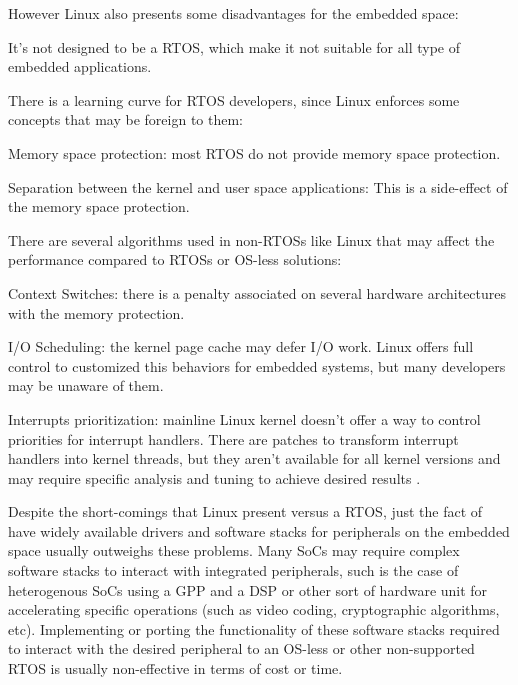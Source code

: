 However Linux also presents some disadvantages for the embedded space:
\begin{itemize*}
\item It's not designed to be a \ac{RTOS}, which make it not suitable for all type of embedded applications.
\item There is a learning curve for \ac{RTOS} developers, since Linux enforces some concepts that may be foreign to them:
	\begin{itemize*}
	\item Memory space protection: most \ac{RTOS} do not provide memory space protection.
	\item Separation between the kernel and user space applications: This is a side-effect of the memory space protection.
	\end{itemize*}
\item There are several algorithms used in non-\acp{RTOS} like Linux that may affect the performance compared to \acp{RTOS} or \ac{OS}-less solutions:
	\begin{itemize*}
	\item Context Switches: there is a penalty associated on several hardware architectures with the memory protection.
	\item I/O Scheduling: the kernel page cache may defer I/O work. Linux offers full control to customized this behaviors for embedded systems, but many developers may be unaware of them.
	\item Interrupts prioritization: mainline Linux kernel doesn't offer a way to control priorities for interrupt handlers. There are patches to transform interrupt handlers into kernel threads, but they aren't available for all kernel versions and may require specific analysis and tuning to achieve desired results \cite{Song_Chubb_10}.
	\end{itemize*}
\end{itemize*}

Despite the short-comings that Linux present versus a \ac{RTOS}, just the fact of have widely available drivers and software stacks for peripherals on the embedded space usually outweighs these problems. Many \acp{SoC} may require complex software stacks to interact with integrated peripherals, such is the case of heterogenous \acp{SoC} using a \ac{GPP} and a \ac{DSP} or other sort of hardware unit for accelerating specific operations (such as video coding, cryptographic algorithms, etc). Implementing or porting the functionality of these software stacks required to interact with the desired peripheral to an \ac{OS}-less or other non-supported \ac{RTOS} is usually non-effective in terms of cost or time.

